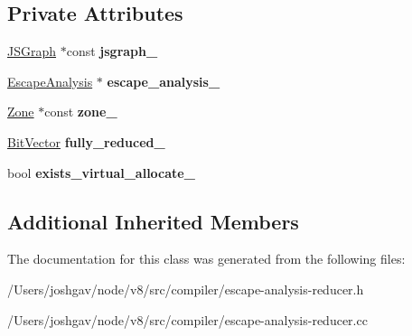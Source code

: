 \subsection*{Private Attributes}
\begin{DoxyCompactItemize}
\item 
\hyperlink{classv8_1_1internal_1_1compiler_1_1_j_s_graph}{J\+S\+Graph} $\ast$const {\bfseries jsgraph\+\_\+}\hypertarget{classv8_1_1internal_1_1compiler_1_1_escape_analysis_reducer_ae134247c026c847f968da80e1aced3f6}{}\label{classv8_1_1internal_1_1compiler_1_1_escape_analysis_reducer_ae134247c026c847f968da80e1aced3f6}

\item 
\hyperlink{classv8_1_1internal_1_1compiler_1_1_escape_analysis}{Escape\+Analysis} $\ast$ {\bfseries escape\+\_\+analysis\+\_\+}\hypertarget{classv8_1_1internal_1_1compiler_1_1_escape_analysis_reducer_a421511f219a6aff81ef1a315c204421f}{}\label{classv8_1_1internal_1_1compiler_1_1_escape_analysis_reducer_a421511f219a6aff81ef1a315c204421f}

\item 
\hyperlink{classv8_1_1internal_1_1_zone}{Zone} $\ast$const {\bfseries zone\+\_\+}\hypertarget{classv8_1_1internal_1_1compiler_1_1_escape_analysis_reducer_a5371a705c8a1f5ce0d2fc043f3ade63a}{}\label{classv8_1_1internal_1_1compiler_1_1_escape_analysis_reducer_a5371a705c8a1f5ce0d2fc043f3ade63a}

\item 
\hyperlink{classv8_1_1internal_1_1_bit_vector}{Bit\+Vector} {\bfseries fully\+\_\+reduced\+\_\+}\hypertarget{classv8_1_1internal_1_1compiler_1_1_escape_analysis_reducer_aafea5e293cfec1427da1487b0ba9933d}{}\label{classv8_1_1internal_1_1compiler_1_1_escape_analysis_reducer_aafea5e293cfec1427da1487b0ba9933d}

\item 
bool {\bfseries exists\+\_\+virtual\+\_\+allocate\+\_\+}\hypertarget{classv8_1_1internal_1_1compiler_1_1_escape_analysis_reducer_a3e3f310f29398c95676f3048cf827d36}{}\label{classv8_1_1internal_1_1compiler_1_1_escape_analysis_reducer_a3e3f310f29398c95676f3048cf827d36}

\end{DoxyCompactItemize}
\subsection*{Additional Inherited Members}


The documentation for this class was generated from the following files\+:\begin{DoxyCompactItemize}
\item 
/\+Users/joshgav/node/v8/src/compiler/escape-\/analysis-\/reducer.\+h\item 
/\+Users/joshgav/node/v8/src/compiler/escape-\/analysis-\/reducer.\+cc\end{DoxyCompactItemize}
